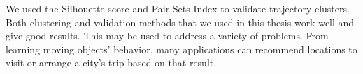 \documentclass[a4paper, 12pt]{article}
\begin{document}
We used the Silhouette score and Pair Sets Index to validate trajectory clusters. Both clustering and validation methods that we used in this thesis work well and give good results.  This may be used to address a variety of problems. From learning moving objects' behavior, many applications can recommend locations to visit or arrange a city's trip based on that result.

\pagebreak


\end{document}
